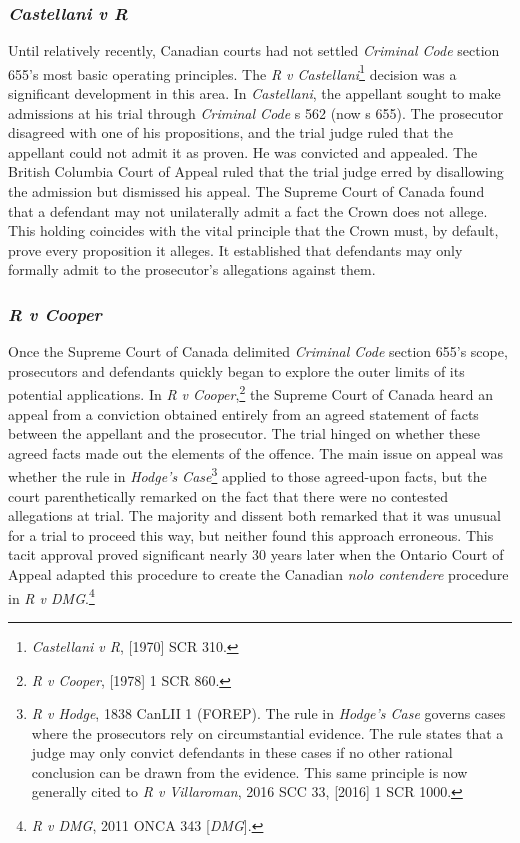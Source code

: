 \subsubsection{\textit{Castellani v R}}

Until relatively recently, Canadian courts had not settled \textit{Criminal Code} section 655's most basic operating principles. The \textit{R v Castellani}\footnote{\textit{Castellani v R}, [1970] SCR 310.} decision was a significant development in this area. In \textit{Castellani}, the appellant sought to make admissions at his trial through \textit{Criminal Code} s 562 (now s 655). The prosecutor disagreed with one of his propositions, and the trial judge ruled that the appellant could not admit it as proven. He was convicted and appealed. The British Columbia Court of Appeal ruled that the trial judge erred by disallowing the admission but dismissed his appeal. The Supreme Court of Canada found that a defendant may not unilaterally admit a fact the Crown does not allege. This holding coincides with the vital principle that the Crown must, by default, prove every proposition it alleges. It established that defendants may only formally admit to the prosecutor's allegations against them. 

\subsubsection{\textit{R v Cooper}}

Once the Supreme Court of Canada delimited \textit{Criminal Code} section 655's scope, prosecutors and defendants quickly began to explore the outer limits of its potential applications. In \textit{R v Cooper},\footnote{\textit{R v Cooper}, [1978] 1 SCR 860.} the Supreme Court of Canada heard an appeal from a conviction obtained entirely from an agreed statement of facts between the appellant and the prosecutor. The trial hinged on whether these agreed facts made out the elements of the offence. The main issue on appeal was whether the rule in \textit{Hodge's Case}\footnote{\textit{R v Hodge}, 1838 CanLII 1 (FOREP). The rule in \textit{Hodge's Case} governs cases where the prosecutors rely on circumstantial evidence. The rule states that a judge may only convict defendants in these cases if no other rational conclusion can be drawn from the evidence. This same principle is now generally cited to \textit{R v Villaroman}, 2016 SCC 33, [2016] 1 SCR 1000.} applied to those agreed-upon facts, but the court parenthetically remarked on the fact that there were no contested allegations at trial. The majority and dissent both remarked that it was unusual for a trial to proceed this way, but neither found this approach erroneous. This tacit approval proved significant nearly 30 years later when the Ontario Court of Appeal adapted this procedure to create the Canadian \textit{nolo contendere} procedure in \textit{R v DMG}.\footnote{\textit{R v DMG}, 2011 ONCA 343 [\textit{DMG}].}

